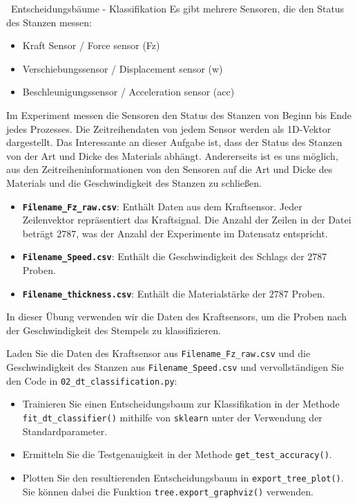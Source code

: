 \begin{task}[credit=4]{\codesym~Entscheidungsbäume - Klassifikation}
Es gibt mehrere Sensoren, die den Status des Stanzen messen:

\begin{itemize}
 \item Kraft Sensor / Force sensor (Fz) 
 \item Verschiebungssensor / Displacement sensor (w)
 \item Beschleunigungssensor / Acceleration sensor (acc)
\end{itemize}
Im Experiment messen die Sensoren den Status des Stanzen von Beginn bis Ende jedes Prozesses.
Die Zeitreihendaten von jedem Sensor werden als 1D-Vektor dargestellt.
Das Interessante an dieser Aufgabe ist, dass der Status des Stanzen von der Art und Dicke des Materials abhängt. Andererseits ist es uns möglich, aus den Zeitreiheninformationen von den Sensoren auf die Art und Dicke des Materials und die Geschwindigkeit des Stanzen zu schließen.

\begin{itemize}
    \item \textbf{\texttt{Filename\_Fz\_raw.csv}}: Enthält Daten aus dem Kraftsensor. Jeder Zeilenvektor repräsentiert das Kraftsignal. Die Anzahl der Zeilen in der Datei beträgt $2787$, was der Anzahl der Experimente im Datensatz entspricht.
    \item \textbf{\texttt{Filename\_Speed.csv}}: Enthält die Geschwindigkeit des Schlags der $2787$ Proben.
    \item \textbf{\texttt{Filename\_thickness.csv}}: Enthält die Materialstärke der $2787$ Proben.
\end{itemize}

In dieser Übung verwenden wir die Daten des Kraftsensors, um die Proben nach der Geschwindigkeit des Stempels zu klassifizieren.

\begin{subtask}[points=3,title={\codesym~\texttt{02\_dt\_classification.py}}]
\label{t:dt_class}
Laden Sie die Daten des Kraftsensor aus \texttt{Filename\_Fz\_raw.csv} und die Geschwindigkeit des Stanzen aus \texttt{Filename\_Speed.csv} und vervollständigen Sie den Code in \texttt{02\_dt\_classification.py}:

\begin{itemize}
 \item[\codesym] Trainieren Sie einen Entscheidungsbaum zur Klassifikation in der Methode \texttt{fit\_dt\_classifier()} mithilfe von \texttt{sklearn} unter der Verwendung der Standardparameter.
 \item[\codesym] Ermitteln Sie die Testgenauigkeit in der Methode \texttt{get\_test\_accuracy()}.\\
 \item[\codesym] Plotten Sie den resultierenden Entscheidungsbaum in \texttt{export\_tree\_plot()}. Sie können dabei die Funktion \texttt{tree.export\_graphviz()} verwenden.
\end{itemize}
\end{subtask}


\end{task}
